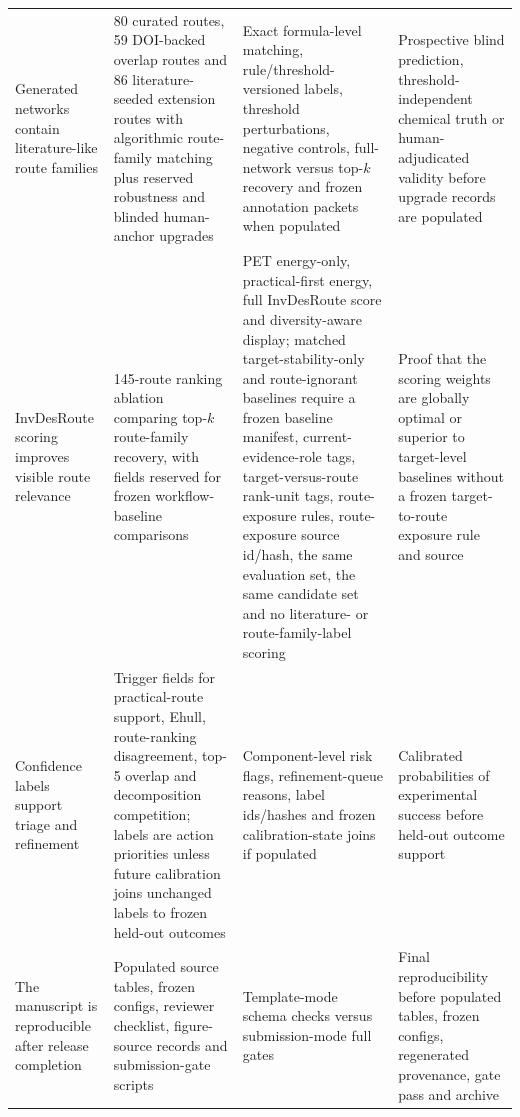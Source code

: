 \documentclass[11pt, letterpaper]{article}
\begin{document}
\begin{table}[p]
\begin{tabular}{L{0.23\textwidth}L{0.30\textwidth}L{0.19\textwidth}L{0.16\textwidth}}
Generated networks contain literature-like route families & 80 curated routes, 59 DOI-backed overlap routes and 86 literature-seeded extension routes with algorithmic route-family matching plus reserved robustness and blinded human-anchor upgrades & Exact formula-level matching, rule/threshold-versioned labels, threshold perturbations, negative controls, full-network versus top-$k$ recovery and frozen annotation packets when populated & Prospective blind prediction, threshold-independent chemical truth or human-adjudicated validity before upgrade records are populated \\
InvDesRoute scoring improves visible route relevance & 145-route ranking ablation comparing top-$k$ route-family recovery, with fields reserved for frozen workflow-baseline comparisons & PET energy-only, practical-first energy, full InvDesRoute score and diversity-aware display; matched target-stability-only and route-ignorant baselines require a frozen baseline manifest, current-evidence-role tags, target-versus-route rank-unit tags, route-exposure rules, route-exposure source id/hash, the same evaluation set, the same candidate set and no literature- or route-family-label scoring & Proof that the scoring weights are globally optimal or superior to target-level baselines without a frozen target-to-route exposure rule and source \\
Confidence labels support triage and refinement & Trigger fields for practical-route support, Ehull, route-ranking disagreement, top-5 overlap and decomposition competition; labels are action priorities unless future calibration joins unchanged labels to frozen held-out outcomes & Component-level risk flags, refinement-queue reasons, label ids/hashes and frozen calibration-state joins if populated & Calibrated probabilities of experimental success before held-out outcome support \\
The manuscript is reproducible after release completion & Populated source tables, frozen configs, reviewer checklist, figure-source records and submission-gate scripts & Template-mode schema checks versus submission-mode full gates & Final reproducibility before populated tables, frozen configs, regenerated provenance, gate pass and archive \\
\bottomrule
\end{tabular}
\label{supp-tab:claim_evidence_ladder}
\end{table}
\end{document}

